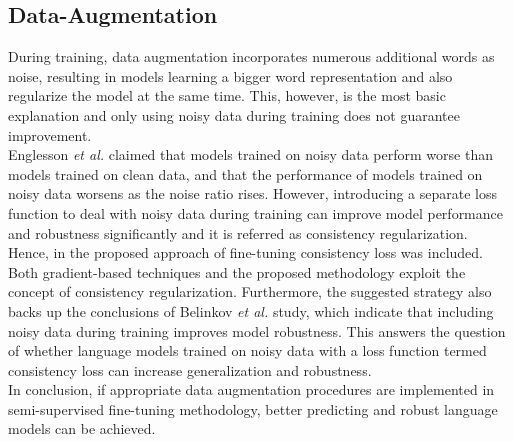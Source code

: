 \documentclass[%
	BCOR=8mm, %
	DIV=12,
	toc=bibliography, %
	toc=listof, %
	oneside, %
	egregdoesnotlikesansseriftitles, %
	]{scrbook}
\begin{document}
\subsection{Data-Augmentation}
During training, data augmentation incorporates numerous additional words as noise, resulting in models learning a bigger word representation and also regularize the model at the same time. This, however, is the most basic explanation and only using noisy data during training does not guarantee improvement. \\
Englesson \textit{et al.} \cite{englesson_consistency_2021} claimed that models trained on noisy data perform worse than models trained on clean data, and that the performance of models trained on noisy data worsens as the noise ratio rises. However, introducing a separate loss function to deal with noisy data during training can improve model performance and robustness significantly and it is referred as consistency regularization.  Hence, in the proposed approach of fine-tuning consistency loss was included.\\
Both gradient-based techniques \cite{miyato_virtual_2018} and the proposed methodology exploit the concept of consistency regularization. Furthermore, the suggested strategy also backs up the conclusions of Belinkov \textit{et al.} \cite{belinkov_synthetic_2018} study, which indicate that including noisy data during training improves model robustness. This answers the question of whether language models trained on noisy data with a loss function termed consistency loss can increase generalization and robustness.\\
In conclusion, if appropriate data augmentation procedures are implemented in semi-supervised fine-tuning methodology, better predicting and robust language models can be achieved.
\end{document}
